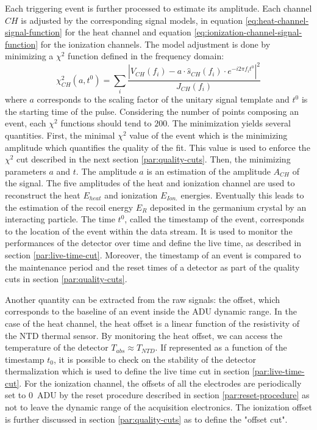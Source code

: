 Each triggering event is further processed to estimate its amplitude. Each channel $CH$ is adjusted by the corresponding signal models, in equation \ref{eq:heat-channel-signal-function} for the heat channel and equation \ref{eq:ionization-channel-signal-function} for the ionization channels. The model adjustment is done by minimizing a $\chi^2$ function defined in the frequency domain:
\begin{equation}
\chi_{CH}^2(a, t^0) =
\sum_i 
\frac{
|\hat{V}_{CH}(f_i) - a \cdot \hat{s}_{CH}(f_i) \cdot e^{-i 2 \pi f_i t^0}|^2
}{
J_{CH}(f_i)
}
\end{equation}
where $a$ corresponds to the scaling factor of the unitary signal template and $t^0$ is the starting time of the pulse. Considering the number of points composing an event, each $\chi^2$ functions should tend to $200$. The minimization yields several quantities. First, the minimal $\chi^2$ value of the event which is the minimizing amplitude which quantifies the quality of the fit. This value is used to enforce the $\chi^2$ cut described in the next section \ref{par:quality-cuts}. Then, the minimizing parameters $a$ and $t$. The amplitude $a$ is an estimation of the amplitude $A_{CH}$ of the signal. The five amplitudes of the heat and ionization channel are used to reconstruct the heat $E_{heat}$ and ionization $E_{Ion.}$ energies. Eventually this leads to the estimation of the recoil energy $E_R$ deposited in the germanium crystal by an interacting particle. The time $t^0$, called the timestamp of the event, corresponds to the location of the event within the data stream. It is used to monitor the performances of the detector over time and define the live time, as described in section \ref{par:live-time-cut}. Moreover, the timestamp of an event is compared to the maintenance period and the reset times of a detector as part of the quality cuts in section \ref{par:quality-cuts}.


Another quantity can be extracted from the raw signals: the offset, which corresponds to the baseline of an event inside the ADU dynamic range. In the case of the heat channel, the heat offset is a linear function of the resistivity of the NTD thermal sensor. By monitoring the heat offset, we can access the temperature of the detector $T_{abs} \approx T_{NTD}$. If represented as a function of the timestamp $t_0$, it is possible to check on the stability of the detector thermalization which is used to define the live time cut in section \ref{par:live-time-cut}.
For the ionization channel, the offsets of all the electrodes are periodically set to \SI{0}{\textsf{ADU}} by the reset procedure described in section \ref{par:reset-procedure} as not to leave the dynamic range of the acquisition electronics. The ionization offset is further discussed in section \ref{par:quality-cuts} as to define the "offset cut".

